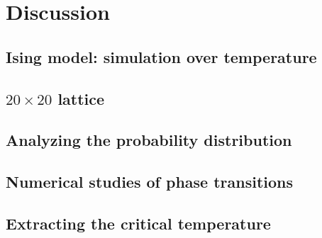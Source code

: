 \documentclass[../main.tex]{subfiles}
\begin{document}
\section{Discussion}

\subsection{Ising model: simulation over temperature}




\subsection{$20 \times 20$ lattice}




\subsection{Analyzing the probability distribution}




\subsection{Numerical studies of phase transitions}




\subsection{Extracting the critical temperature}
\end{document}
